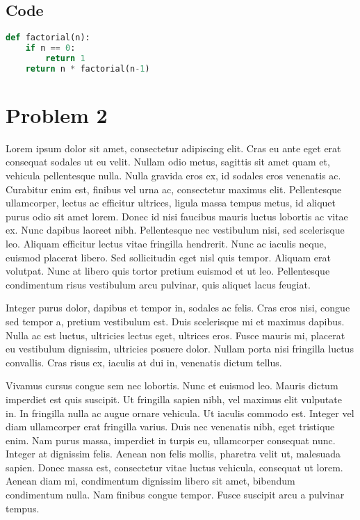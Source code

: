 \documentclass[a4paper,11pt]{article}
\begin{document}
\subsection*{Code}
\begin{lstlisting}[language=Python]
def factorial(n):
    if n == 0:
        return 1
    return n * factorial(n-1)
\end{lstlisting}


\section*{Problem 2}

Lorem ipsum dolor sit amet, consectetur adipiscing elit. Cras eu ante
eget erat consequat sodales ut eu velit. Nullam odio metus, sagittis sit
 amet quam et, vehicula pellentesque nulla. Nulla gravida eros ex, id
sodales eros venenatis ac. Curabitur enim est, finibus vel urna ac,
consectetur maximus elit. Pellentesque ullamcorper, lectus ac efficitur
ultrices, ligula massa tempus metus, id aliquet purus odio sit amet
lorem. Donec id nisi faucibus mauris luctus lobortis ac vitae ex. Nunc
dapibus laoreet nibh. Pellentesque nec vestibulum nisi, sed scelerisque
leo. Aliquam efficitur lectus vitae fringilla hendrerit. Nunc ac iaculis
 neque, euismod placerat libero. Sed sollicitudin eget nisl quis tempor.
 Aliquam erat volutpat. Nunc at libero quis tortor pretium euismod et ut
 leo. Pellentesque condimentum risus vestibulum arcu pulvinar, quis
aliquet lacus feugiat.




Integer purus dolor, dapibus et tempor in, sodales ac felis. Cras eros
nisi, congue sed tempor a, pretium vestibulum est. Duis scelerisque mi
et maximus dapibus. Nulla ac est luctus, ultricies lectus eget, ultrices
 eros. Fusce mauris mi, placerat eu vestibulum dignissim, ultricies
posuere dolor. Nullam porta nisi fringilla luctus convallis. Cras risus
ex, iaculis at dui in, venenatis dictum tellus.




Vivamus cursus congue sem nec lobortis. Nunc et euismod leo. Mauris
dictum imperdiet est quis suscipit. Ut fringilla sapien nibh, vel
maximus elit vulputate in. In fringilla nulla ac augue ornare vehicula.
Ut iaculis commodo est. Integer vel diam ullamcorper erat fringilla
varius. Duis nec venenatis nibh, eget tristique enim. Nam purus massa,
imperdiet in turpis eu, ullamcorper consequat nunc. Integer at dignissim
 felis. Aenean non felis mollis, pharetra velit ut, malesuada sapien.
Donec massa est, consectetur vitae luctus vehicula, consequat ut lorem.
Aenean diam mi, condimentum dignissim libero sit amet, bibendum
condimentum nulla. Nam finibus congue tempor. Fusce suscipit arcu a
pulvinar tempus.
\end{document}
